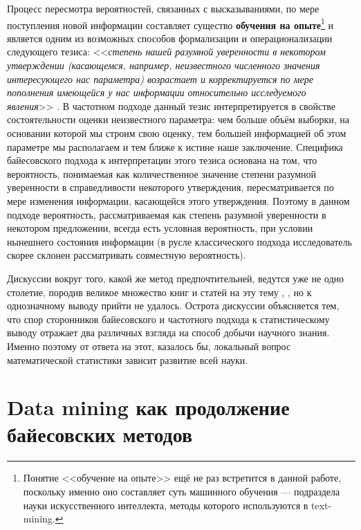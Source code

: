 Процесс пересмотра вероятностей, связанных с высказываниями, по мере поступления новой информации составляет существо \textbf{обучения на опыте}\footnote{Понятие <<обучение на опыте>> ещё не раз встретится в данной работе, поскольку именно оно составляет суть машинного обучения --- подраздела науки искусственного интеллекта, методы которого используются в text-mining.} \cite[стр. 21-22]{Zellner1980} и  является одним из возможных способов формализации и операционализации следующего тезиса: <<\textit{степень нашей разумной уверенности в некотором утверждении (касающемся, например, неизвестного численного значения интересующего нас параметра) возрастает и корректируется по мере пополнения имеющейся у нас информации относительно исследуемого явления}>> \cite[стр. 93]{Aivazyan2008}. В частотном подходе данный тезис интерпретируется в свойстве состоятельности оценки неизвестного параметра: чем больше объём выборки, на основании которой мы строим свою оценку, тем большей информацией об этом параметре мы располагаем и тем ближе к истине наше заключение. Специфика байесовского подхода к интерпретации этого тезиса основана на том, что вероятность, понимаемая как количественное значение степени разумной уверенности в справедливости некоторого утверждения, пересматривается по мере изменения информации, касающейся этого утверждения. Поэтому в данном подходе вероятность, рассматриваемая как степень разумной уверенности в некотором предложении, всегда есть условная вероятность, при условии нынешнего состояния информации (в русле классического подхода исследователь скорее склонен рассматривать совместную вероятность\cite[стр. 5]{handbook_stat_dm}).

Дискуссии вокруг того, какой же метод предпочтительней, ведутся уже не одно столетие, породив великое множество книг и статей на эту тему \cite{Jeffreys1983}, \cite{Efron2005}, но к однозначному выводу прийти не удалось. Острота дискуссии объясняется тем, что спор сторонников байесовского и частотного подхода к статистическому выводу отражает два различных взгляда на способ добычи научного знания. Именно поэтому от ответа на этот, казалось бы, локальный вопрос математической статистики зависит развитие всей науки.

\section{Data mining как продолжение байесовских методов} \label{sect1_2}

\clearpage